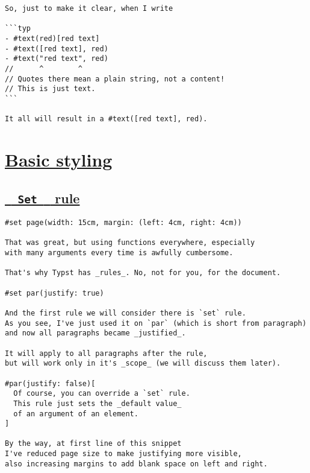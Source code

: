 \begin{verbatim}
So, just to make it clear, when I write

```typ
- #text(red)[red text]
- #text([red text], red)
- #text("red text", red)
//      ^        ^
// Quotes there mean a plain string, not a content!
// This is just text.
```

It all will result in a #text([red text], red).
\end{verbatim}

\pandocbounded{}

\section{\texorpdfstring{\hyperref[basic-styling]{Basic
styling}}{Basic styling}}\label{basic-styling}

\subsection{\texorpdfstring{\hyperref[set-rule]{\texttt{\ }{\texttt{\ Set\ }}\texttt{\ }
rule}}{  Set   rule}}\label{set-rule}

\begin{verbatim}
#set page(width: 15cm, margin: (left: 4cm, right: 4cm))

That was great, but using functions everywhere, especially
with many arguments every time is awfully cumbersome.

That's why Typst has _rules_. No, not for you, for the document.

#set par(justify: true)

And the first rule we will consider there is `set` rule.
As you see, I've just used it on `par` (which is short from paragraph)
and now all paragraphs became _justified_.

It will apply to all paragraphs after the rule,
but will work only in it's _scope_ (we will discuss them later).

#par(justify: false)[
  Of course, you can override a `set` rule.
  This rule just sets the _default value_
  of an argument of an element.
]

By the way, at first line of this snippet
I've reduced page size to make justifying more visible,
also increasing margins to add blank space on left and right.
\end{verbatim}

